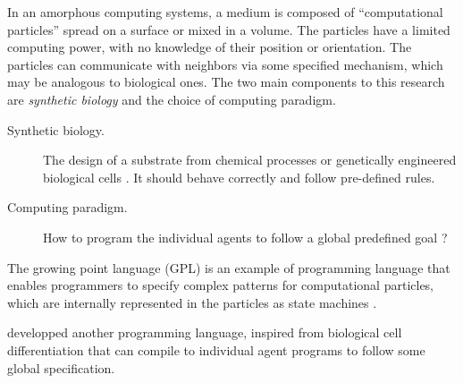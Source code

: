 In an amorphous computing systems, a medium is composed of ``computational
particles'' spread on a surface or mixed in a volume. The particles have a
limited computing power, with no knowledge of their position or orientation. The
particles can communicate with neighbors via some specified mechanism, which may
be analogous to biological ones. The two main components to this research are 
\emph{synthetic biology} and the choice of computing paradigm.
\begin{description}
  \item[Synthetic biology.] The design of a substrate from chemical processes or
        genetically engineered biological cells
        \parencite{weissVivoDigitalCircuits2002}. It should behave correctly and
        follow pre-defined rules.
  \item[Computing paradigm.] How to program the individual agents to follow a
        global predefined goal
        \parencite{nagpalProgrammableSelfassemblyConstructing2001}?
\end{description}


The growing point language (GPL) is an example of programming language that
enables programmers to specify complex patterns for computational particles,
which are internally represented in the particles as state machines
\parencite{cooreBotanicalComputingDevelopmental1999}.

\textcite{nagpalProgrammableSelfassemblyUsing2002} developped another
programming language, inspired from biological cell differentiation
\parencite{lawrenceMakingFlyGenetics1992,
  wolpertPositionalInformationSpatial1969} that can compile to individual agent
programs to follow some global specification.
